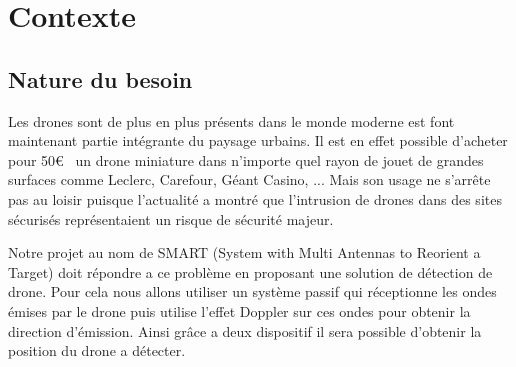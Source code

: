 
\chapter{Contexte}

\section{Nature du besoin}

Les drones sont de plus en plus présents dans le monde moderne est font maintenant partie intégrante du paysage urbains. Il est en effet possible d'acheter pour 50\euro~  un drone miniature dans n'importe quel rayon de jouet de grandes surfaces comme Leclerc, Carefour, Géant Casino, ... %
Mais son usage ne s'arrête pas au loisir puisque l'actualité a montré que l'intrusion de drones dans des sites sécurisés représentaient un risque de sécurité majeur.

Notre projet au nom de SMART (System with Multi Antennas to Reorient a Target) doit répondre a ce problème en proposant une solution de détection de drone. Pour cela nous allons utiliser un système passif qui réceptionne les ondes émises par le drone puis utilise l'effet Doppler sur ces ondes pour obtenir la direction d'émission. Ainsi grâce a deux dispositif il sera possible d'obtenir la position du drone a détecter. 




